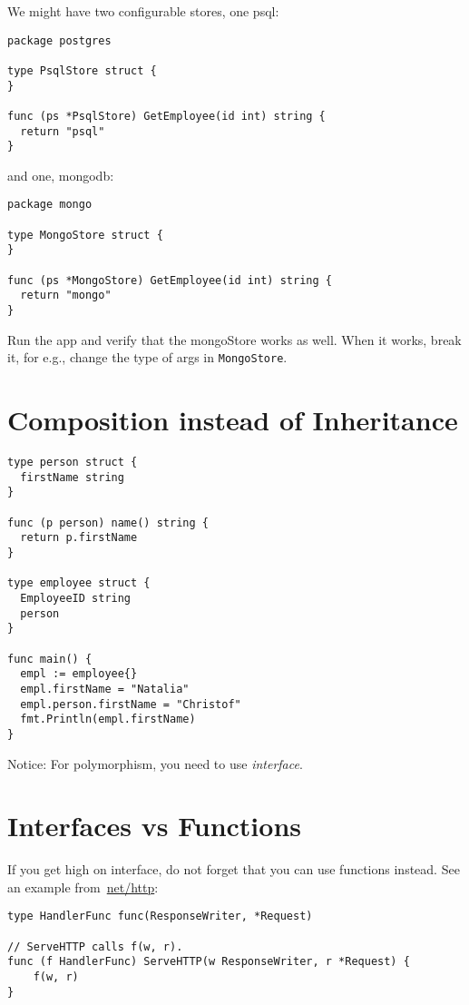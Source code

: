 \documentclass[11pt, letterpaper]{article}
\begin{document}
We might have two configurable stores, one psql:

\begin{verbatim}
package postgres

type PsqlStore struct {
}

func (ps *PsqlStore) GetEmployee(id int) string {
  return "psql"
}
\end{verbatim}

and one, mongodb:

\begin{verbatim}
package mongo

type MongoStore struct {
}

func (ps *MongoStore) GetEmployee(id int) string {
  return "mongo"
}
\end{verbatim}

Run the app and verify that the mongoStore works as well. When it works, break it, for e.g., change the type of args in \texttt{MongoStore}.

\section{Composition instead of Inheritance}

\begin{verbatim}
type person struct {
  firstName string
}

func (p person) name() string {
  return p.firstName
}

type employee struct {
  EmployeeID string
  person
}

func main() {
  empl := employee{}
  empl.firstName = "Natalia"
  empl.person.firstName = "Christof"
  fmt.Println(empl.firstName)
}
\end{verbatim}

Notice: For polymorphism, you need to use \emph{interface}.

\section{Interfaces vs Functions}

If you get high on interface, do not forget that you can use functions instead. See an example from~\href{https://golang.org/src/net/http/server.go}{net/http}:

\begin{verbatim}
type HandlerFunc func(ResponseWriter, *Request)

// ServeHTTP calls f(w, r).
func (f HandlerFunc) ServeHTTP(w ResponseWriter, r *Request) {
    f(w, r)
}
\end{verbatim}
\end{document}
